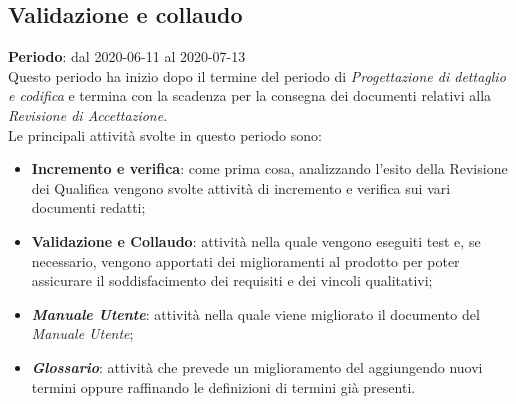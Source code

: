 \subsection{Validazione e collaudo}
\textbf{Periodo}: dal 2020-06-11 al 2020-07-13 \\
Questo periodo ha inizio dopo il termine del periodo di \textit{Progettazione di dettaglio e codifica} e termina con la scadenza per la consegna dei documenti relativi alla \textit{Revisione di Accettazione}. \\
Le principali attività svolte in questo periodo sono:
\begin{itemize}
	\item \textbf{Incremento e verifica}: come prima cosa, analizzando l'esito della Revisione dei Qualifica vengono svolte attività di incremento e verifica sui vari documenti redatti;
	\item \textbf{Validazione e Collaudo}: attività nella quale vengono eseguiti test e, se necessario, vengono apportati dei miglioramenti al prodotto per poter assicurare il soddisfacimento dei requisiti e dei vincoli qualitativi;
	\item \textbf{\textit{Manuale Utente}}: attività nella quale viene migliorato il documento del \textit{Manuale Utente};
	\item \textbf{\textit{Glossario}}: attività che prevede un miglioramento del \Glossario aggiungendo nuovi termini oppure raffinando le definizioni di termini già presenti.
\end{itemize}
